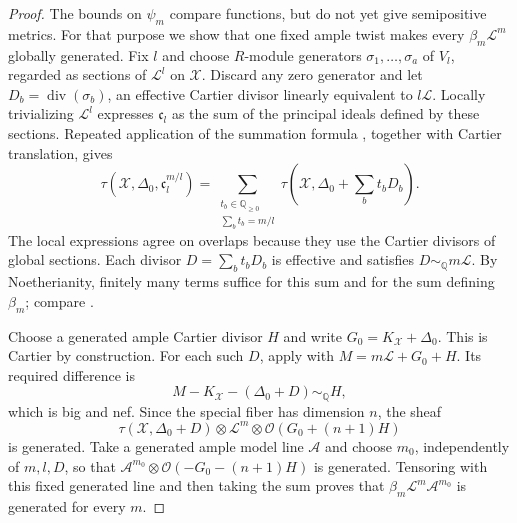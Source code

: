\documentclass[11pt,reqno]{amsart}
\theoremstyle{definition}
\theoremstyle{remark}
\numberwithin{equation}{section}
\begin{document}
\begin{proof}
The bounds on $\psi_m$ compare functions, but do not yet give
semipositive metrics. For that purpose we show that one fixed ample
twist makes every $\beta_m\mathcal L^m$ globally generated. Fix $l$ and choose $R$-module generators
$\sigma_1,\ldots,\sigma_a$ of $V_l$, regarded as sections of
$\mathcal L^l$ on $\mathcal X$. Discard any zero generator and let
$D_b=\operatorname{div}(\sigma_b)$, an effective Cartier divisor
linearly equivalent to $l\mathcal L$. Locally trivializing
$\mathcal L^l$ expresses $\mathfrak c_l$ as the sum of the
principal ideals defined by these sections. Repeated application of
the summation formula \cite[Theorem~8.41(g)]{BMP}, together with
Cartier translation, gives
\[
 \tau(\mathcal X,\Delta_0,\mathfrak c_l^{m/l})
 =\sum_{\substack{t_b\in\mathbb Q_{\geq0}\\\sum_b t_b=m/l}}
   \tau\left(\mathcal X,\Delta_0+\sum_b t_bD_b\right).
\]
The local expressions agree on overlaps because they use the
Cartier divisors of global sections. Each divisor
$D=\sum_b t_bD_b$ is effective and satisfies
$D\sim_{\mathbb Q}m\mathcal L$. By Noetherianity, finitely many
terms suffice for this sum and for the sum defining $\beta_m$;
compare \cite[Remark~8.42]{BMP}.

Choose a generated ample Cartier divisor $H$ and write
$G_0=K_{\mathcal X}+\Delta_0$. This is Cartier by construction.
For each such $D$, apply \cite[Corollary~7.24]{BMP} with
$M=m\mathcal L+G_0+H$. Its required difference is
\[
 M-K_{\mathcal X}-(\Delta_0+D)
       \sim_{\mathbb Q}H,
\]
which is big and nef. Since the special fiber has dimension $n$,
the sheaf
\[
 \tau(\mathcal X,\Delta_0+D)
       \otimes\mathcal L^m\otimes\mathcal O(G_0+(n+1)H)
\]
is generated. Take a generated ample model line $\mathcal A$ and
choose $m_0$, independently of $m,l,D$, so that
$\mathcal A^{m_0}\otimes\mathcal O(-G_0-(n+1)H)$ is generated.
Tensoring with this fixed generated line and then taking the sum
proves that $\beta_m\mathcal L^m\mathcal A^{m_0}$ is generated for
every $m$.


\end{proof}
\end{document}
